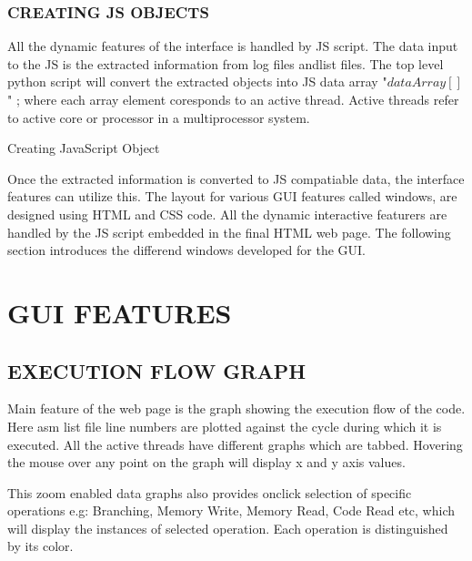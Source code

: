 \subsubsection{CREATING JS OBJECTS}
All the dynamic features of the interface is handled by JS script. The data input to the JS is the extracted information from log files andlist files. The top level python script will convert the extracted objects into JS data array "$dataArray[]$" ; where each array element coresponds to an active thread. Active threads refer to active core or processor in a multiprocessor system.  

\IncMargin{1em}
\begin{algorithm}[H]
\DontPrintSemicolon
{} 
\KwFn {}
\BlankLine
{}
\caption{Creating JavaScript Object}
\end{algorithm}\DecMargin{1em}



Once the extracted information is converted to JS compatiable data, the interface features can utilize this. The layout for various GUI features called windows, are designed using HTML and CSS code. All the dynamic interactive featurers are handled by the JS script embedded in the final HTML web page. The following section introduces the differend windows developed for the GUI.

\section {GUI FEATURES}

\subsection {EXECUTION FLOW GRAPH}
Main feature of the web page is the graph showing the execution flow of the code. Here asm list file line numbers are plotted against the cycle during which it is executed. All the active threads have different graphs which are tabbed. Hovering the mouse over any point on the graph will display x and y axis values. 
 
This zoom enabled data graphs also provides onclick selection of specific operations e.g: Branching, Memory Write, Memory Read, Code Read etc, which will display the instances of selected operation. Each operation is distinguished by its color.   

